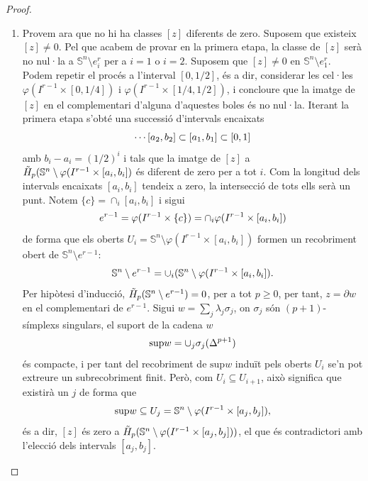 \documentclass[../main.tex]{subfiles}
\begin{document}
\begin{proof}
\begin{enumerate}
    \item Provem ara que no hi ha classes $[z]$ diferents de zero. Suposem que existeix $[z]\not=0$. Pel que acabem de provar en la primera etapa, la classe de $[z]$ serà no nul·la a $\mathbb{S}^n\setminus e_i^r$ per a $i = 1$ o $i=2$. Suposem que $[z]\not=0$ en $\mathbb{S}^n\setminus e_1^r$. Podem repetir el procés a l'interval $[0,1/2]$, és a dir, considerar les cel·les $\varphi(I^{r-1}\times[0,1/4])$ i $\varphi(I^{r-1}\times[1/4,1/2])$, i concloure que la imatge de $[z]$ en el complementari d'alguna d'aquestes boles és no nul·la. Iterant la primera etapa s'obté una successió d'intervals encaixats
    \begin{equation}
        \notag
        \cdots [a_2,b_2]\subset[a_1,b_1]\subset[0,1]
    \end{equation}
    amb $b_i-a_i = (1/2)^{i}$ i tals que la imatge de $[z]$ a $\Tilde{H}_p(\mathbb{S}^n\setminus \varphi(I^{r-1}\times[a_i,b_i])$ és diferent de zero per a tot $i$. Com la longitud dels intervals encaixats $[a_i,b_i]$ tendeix a zero, la intersecció de tots ells serà un punt. Notem $\{c\}=\cap_i[a_i,b_i]$ i sigui
    \begin{equation}
        \notag
        e^{r-1} = \varphi(I^{r-1}\times\{c\}) = \cap_i\varphi(I^{r-1}\times[a_i,b_i])
    \end{equation}
    de forma que els oberts $U_i = \mathbb{S}^n\setminus\varphi(I^{r-1}\times[a_i,b_i])$ formen un recobriment obert de $\mathbb{S}^n\setminus e^{r-1}$:
    \begin{equation}
        \notag
        \mathbb{S}^n\setminus e^{r-1} = \cup_i(\mathbb{S}^n\setminus\varphi(I^{r-1}\times[a_i,b_i]).
    \end{equation}
    Per hipòtesi d'inducció, $\Tilde{H}_p(\mathbb{S}^n\setminus e^{r-1}) = 0$, per a tot $p\geq 0$, per tant, $z = \partial w$ en el complementari de $e^{r-1}$. Sigui $w = \sum_j\lambda_j\sigma_j$, on $\sigma_j$ són $(p+1)$-símplexs singulars, el suport de la cadena $w$
    \begin{equation}
        \notag
        \mathrm{sup}w = \cup_j\sigma_j(\Delta^{p+1})
    \end{equation}
    és compacte, i per tant del recobriment de $\mathrm{sup}w$ induït pels oberts $U_i$ se'n pot extreure un subrecobriment finit. Però, com $U_i\subseteq U_{i+1}$, això significa que existirà un $j$ de forma que
    \begin{equation}
        \notag
        \mathrm{sup}w\subseteq U_j =\mathbb{S}^n\setminus\varphi(I^{r-1}\times[a_j,b_j]),
    \end{equation}
    és a dir, $[z]$ és zero a $\Tilde{H}_p(\mathbb{S}^n\setminus\varphi(I^{r-1}\times[a_j,b_j]))$, el que és contradictori amb l'elecció dels intervals $[a_j,b_j]$.
\end{enumerate}
\end{proof}
\end{document}
